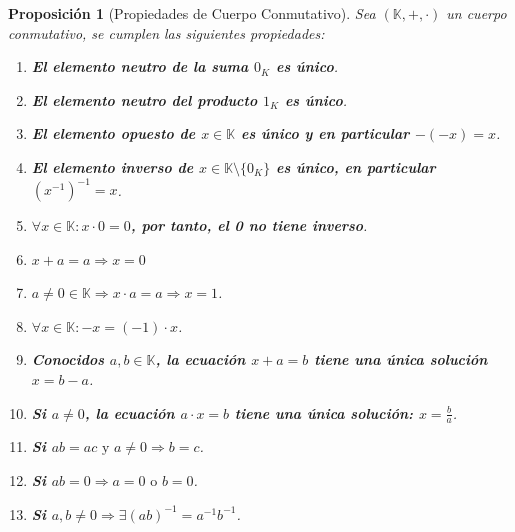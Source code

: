 \documentclass[10pt,a4paper,openright]{book}
\theoremstyle{break}
\newtheorem{prop}{Proposición}[chapter]
\begin{document}
\begin{prop}[Propiedades de Cuerpo Conmutativo]
Sea $(\mathbb K, +, \cdot)$ un cuerpo conmutativo, se cumplen las siguientes propiedades:
\begin{enumerate}
\item \textbf{El elemento neutro de la suma $0_K$ es único}.
\item \textbf{El elemento neutro del producto $1_K$ es único}. 
\item \textbf{El elemento opuesto de $x\in \mathbb K$ es único y en particular $-(-x)=x$}.
\item \textbf{El elemento inverso de $x \in \mathbb K\setminus\{0_K\}$ es único, en particular $(x^{-1})^{-1} = x$}.
\item \textbf{$\forall x\in \mathbb K: x\cdot 0=0$, por tanto, el 0 no tiene inverso}.
\item $x+a=a\Rightarrow x=0$
\item $a\neq 0\in \mathbb K \Rightarrow x\cdot a=a\Rightarrow x=1$.
\item \textbf{$\forall x\in \mathbb K : -x=(-1)\cdot x$}.
\item \textbf{Conocidos $a, b\in \mathbb{K}$, la ecuación $x+a=b$ tiene una única solución $x=b-a$}.
\item \textbf{Si $a\neq 0$, la ecuación $a\cdot x=b$ tiene una única solución: $x=\frac{b}{a}$}.
\item \textbf{Si $ab=ac \mbox{ y } a\neq 0 \Rightarrow b=c$}. 
\item \textbf{Si $ab=0\Rightarrow a=0 \mbox{ o } b=0$}.
\item \textbf{Si $a, b \neq 0 \Rightarrow \exists (ab)^{-1} = a^{-1}b^{-1}$}.
\end{enumerate}
\end{prop}
\end{document}
